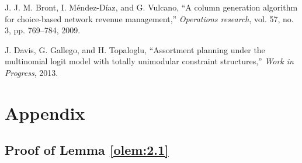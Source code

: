 \documentclass[letterpaper, 10 pt, conference]{ieeeconf}  %
\theoremstyle{plain}
\theoremstyle{definition}
\theoremstyle{remark}
\begin{document}
\begin{thebibliography}{99}
J. J. M. Bront, I. Méndez-Díaz, and G. Vulcano, “A column generation algorithm for choice-based network revenue management,” \textit{Operations research}, vol. 57, no. 3, pp. 769–784, 2009.

J. Davis, G. Gallego, and H. Topaloglu, “Assortment planning under the multinomial logit model with totally
unimodular constraint structures,” \textit{Work in Progress}, 2013.

\end{thebibliography}

\newpage
\onecolumn
\section*{Appendix}
\subsection{Proof of Lemma \ref{olem:2.1}}
\end{document}
